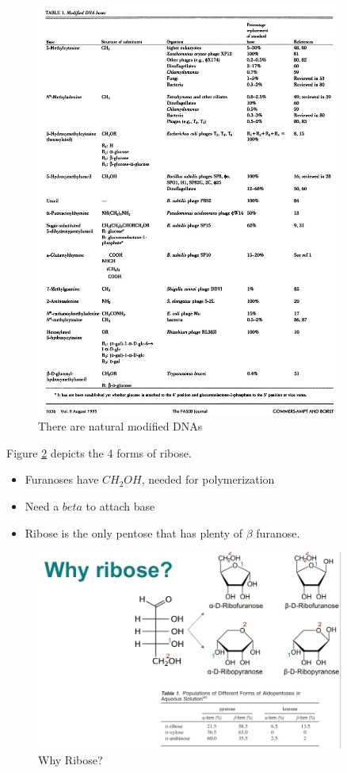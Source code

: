 \documentclass[]{article}
\begin{document}
\begin{figure}[H]
	\caption{There are natural modified DNAs} \label{fig:NaturalxNA} 
	\includegraphics[width=0.9\textwidth]{NaturalxNA}
\end{figure}

Figure \ref{fig:WhyRibose} depicts the 4 forms of ribose\cite{wei2009permeation}.
\begin{itemize}
	\item Furanoses have $CH_2OH$, needed for polymerization
	\item Need a $beta$ to attach base
	\item Ribose is the only pentose that has plenty of $\beta$ furanose. 
\end{itemize}
\begin{figure}[H]
	\caption{Why Ribose?} \label{fig:WhyRibose} 
	\includegraphics[width=0.9\textwidth]{WhyRibose}
\end{figure}
\end{document}
